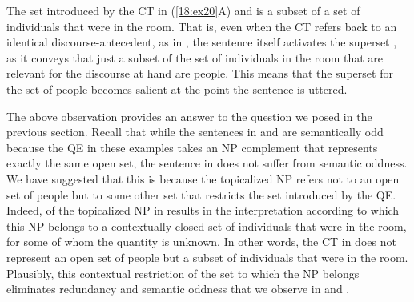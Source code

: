\documentclass[output=paper,modfonts,newtxmath,hidelinks]{langscibook}
\begin{document}
The set introduced by the CT in (\ref{18:ex20}A) and  is a subset of a set of individuals that were  in the room. That is, even when the CT refers back to an identical discourse-antecedent, as in , the sentence itself activates the superset , as it conveys that just a subset of the set of individuals in the room that are relevant for the discourse at hand are people. This means that the superset for the set of people becomes salient at the point the sentence is uttered.

The above observation provides an answer to the question we posed in the previous section. Recall that while the sentences in  and  are semantically odd because the QE in these examples takes an NP complement that represents exactly the same open set, the sentence in  does not suffer from semantic oddness. We have suggested that this is because the topicalized NP refers not to an open set of people but to some other set that restricts the set introduced by the QE. Indeed,   of the topicalized NP in  results in the interpretation according to which this NP belongs to a contextually closed set of individuals that were  in the room, for some of whom the quantity is unknown. In other words, the CT in  does not represent an open set of people but a subset of individuals that were  in the room. Plausibly, this contextual restriction of the set to which the NP belongs eliminates redundancy and semantic oddness that we observe in  and .
\end{document}
